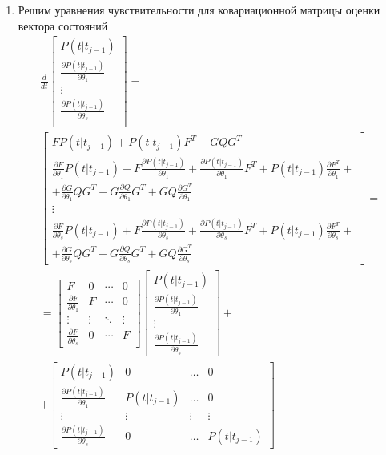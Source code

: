\documentclass[a4paper,14pt]{extarticle}
\newcommand{\pd}[2]{\frac{\partial #1}{\partial #2}}
\begin{document}
\begin{enumerate}
\item Решим уравнения чувствительности для ковариационной матрицы оценки
	вектора состояний
\begin{gather*}
	\frac{d}{dt}	
	\begin{bmatrix}
		P(t|t_{j-1}) \\
		\pd{P(t|t_{j-1})}{\theta_1} \\
		\vdots \\
		\pd{P(t|t_{j-1})}{\theta_s} \\
	\end{bmatrix} = \\
	\begin{bmatrix}
		F P(t|t_{j-1}) + P(t|t_{j-1}) F^T + GQG^T \\
		\pd{F}{\theta_1} P(t|t_{j-1}) + F \pd{P(t|t_{j-1})}{\theta_1} +
			\pd{P(t|t_{j-1})}{\theta_1} F^T + P(t|t_{j-1}) \pd{F^T}{\theta_1} + \\
			+ \pd{G}{\theta_1} Q G^T + G \pd{Q}{\theta_1} G^T +
			G Q \pd{G^T}{\theta_1} \\
		\vdots \\
		\pd{F}{\theta_s} P(t|t_{j-1}) + F \pd{P(t|t_{j-1})}{\theta_s} +
			\pd{P(t|t_{j-1})}{\theta_s} F^T + P(t|t_{j-1}) \pd{F^T}{\theta_s} + \\
			+ \pd{G}{\theta_s} Q G^T + G \pd{Q}{\theta_s} G^T +
			G Q \pd{G^T}{\theta_s}  
	\end{bmatrix} = \\ =
	\begin{bmatrix}
		F & 0 & \cdots & 0 \\
		\pd{F}{\theta_1} & F & \cdots & 0 \\
		\vdots & \vdots & \ddots & \vdots \\
		\pd{F}{\theta_s} & 0 & \cdots & F
	\end{bmatrix}
	\begin{bmatrix}
		P(t|t_{j-1}) \\
		\pd{P(t|t_{j-1})}{\theta_1} \\
		\vdots \\
		\pd{P(t|t_{j-1})}{\theta_s}
	\end{bmatrix} + \\ +
	\begin{bmatrix}
		P(t|t_{j-1}) & 0 & \ldots & 0 \\
		\pd{P(t|t_{j-1})}{\theta_1} & P(t|t_{j-1}) & \ldots & 0 \\
		\vdots & \vdots & \vdots & \vdots \\
		\pd{P(t|t_{j-1})}{\theta_s} & 0 & \ldots & P(t|t_{j-1})

\end{bmatrix}
\end{gather*}
\end{enumerate}
\end{document}

